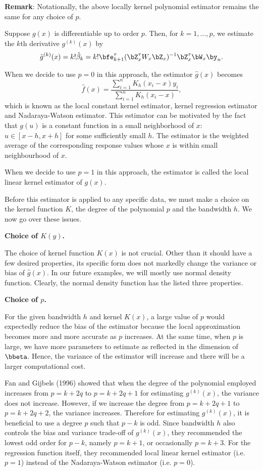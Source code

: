 \vs
\noindent
{\bf Remark}: Notationally, the above locally kernel polynomial
estimator remains the same for any choice of $p$.

Suppose $g(x)$ is differentiable up to order $p$.
Then, for $k=1, \ldots, p$, we estimate 
the $k$th derivative $g^{(k)}(x)$ by
\[
\hat g^{(k)}(x)
=
 k! \hat \beta_k
=k! {\bfe}_{k+1}^\tau (\bZ^\tau_x W_x \bZ _x)^{-1}\bZ^\tau_x \bW_x \by_n.
\]

When we decide to use $p=0$ in this approach, the estimator
$\hat g(x)$ becomes
\[
\hat f(x)
=\frac{\sum_{i=1}^n K_h(x_i-x) y_i} {\sum_{i=1}^n K_h(x_i-x)},
\]
which is known as the local constant kernel estimator,
kernel regression estimator  and  Nadaraya-Watson estimator. 
This estimator can be motivated by the fact that $g(u)$ is a constant
function in a small neighborhood of $x$:  $u \in [x-h, x+h]$
for some sufficiently small $h$.  The estimator is the weighted
average of the corresponding response values whose $x$
is within small neighbourhood of $x$.

When we decide to use $p=1$ in this approach, the estimator is 
called the local linear kernel estimator of $g(x)$. 

Before this estimator is applied to any specific data, we must
make a choice on the kernel function $K$, the degree of the
polynomial $p$ and the bandwidth  $h$.
We now go over these issues.

\vs\vs\noindent
{\bf Choice of $K(y)$.}

The choice of kernel function $K(x)$ is not crucial. 
Other than it should have a few desired properties,
its specific form does not markedly change the variance or
bias of $\hat g(x)$.
In our future examples, we will 
mostly use normal density function.
Clearly, the normal density function has the listed three
properties.

\vs\noindent
{\bf Choice of $p$.}

For the given bandwidth $h$ and kernel $K(x)$, 
a large value of $p$ would expectedly reduce the bias of 
the estimator because the local approximation becomes 
more and more accurate  as $p$ increases. 
At the same time, when $p$ is large, we have more parameters
to estimate as reflected in the dimension of $\bbeta$.
Hence, the variance of the estimator will increase and
there will be a larger computational cost.

Fan and Gijbels (1996) showed that when the degree
of the polynomial employed increases from $p=k+2q$ to
$p=k+2q+1$ for estimating $g^{(k)}(x)$,  the variance 
does not increase.  
However, if we increase the degree from $p=k+2q+1$ to $p=k+2q+2$,
the variance increases.  
Therefore for estimating $g^{(k)}(x)$, 
it is beneficial to use a degree $p$ such that $p-k$ is odd. 
Since bandwidth $h$ also controls the bias and variance 
trade-off of $g^{(k)}(x)$, they recommended the lowest odd order for $p-k$, 
namely  $p=k+1$, or occasionally $p=k+3$. 
For the regression function itself, they recommended
local linear kernel estimator (i.e. $p=1$) instead of the 
Nadaraya-Watson estimator (i.e. $p=0$). 

